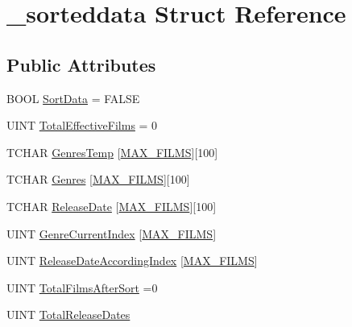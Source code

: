 \hypertarget{struct__sorteddata}{}\section{\+\_\+sorteddata Struct Reference}
\label{struct__sorteddata}
\subsection*{Public Attributes}
\begin{DoxyCompactItemize}
\item 
B\+O\+O\+L \hyperlink{struct__sorteddata_a3c45077dc4150390e3402acf51e8ee58}{Sort\+Data} = F\+A\+L\+S\+E
\item 
U\+I\+N\+T \hyperlink{struct__sorteddata_aa4043574ded74858a03e1ba566ee3fbc}{Total\+Effective\+Films} = 0
\item 
T\+C\+H\+A\+R \hyperlink{struct__sorteddata_a7d7b308abf87e4def51864eafeb8187d}{Genres\+Temp} \mbox{[}\hyperlink{_b_o_w-a_01film_01guessing_01game_8cpp_aa31048f49d109f6551271267f3470d11}{M\+A\+X\+\_\+\+F\+I\+L\+M\+S}\mbox{]}\mbox{[}100\mbox{]}
\item 
T\+C\+H\+A\+R \hyperlink{struct__sorteddata_abc4b7fe250ca171576e556746b6746f1}{Genres} \mbox{[}\hyperlink{_b_o_w-a_01film_01guessing_01game_8cpp_aa31048f49d109f6551271267f3470d11}{M\+A\+X\+\_\+\+F\+I\+L\+M\+S}\mbox{]}\mbox{[}100\mbox{]}
\item 
T\+C\+H\+A\+R \hyperlink{struct__sorteddata_ab85283a73e4e2969636d21578ee513b8}{Release\+Date} \mbox{[}\hyperlink{_b_o_w-a_01film_01guessing_01game_8cpp_aa31048f49d109f6551271267f3470d11}{M\+A\+X\+\_\+\+F\+I\+L\+M\+S}\mbox{]}\mbox{[}100\mbox{]}
\item 
U\+I\+N\+T \hyperlink{struct__sorteddata_ae1caef01262daf05883c3dc41e4bac7c}{Genre\+Current\+Index} \mbox{[}\hyperlink{_b_o_w-a_01film_01guessing_01game_8cpp_aa31048f49d109f6551271267f3470d11}{M\+A\+X\+\_\+\+F\+I\+L\+M\+S}\mbox{]}
\item 
U\+I\+N\+T \hyperlink{struct__sorteddata_a99040a368be9251b62ee5cdef76dbc05}{Release\+Date\+According\+Index} \mbox{[}\hyperlink{_b_o_w-a_01film_01guessing_01game_8cpp_aa31048f49d109f6551271267f3470d11}{M\+A\+X\+\_\+\+F\+I\+L\+M\+S}\mbox{]}
\item 
U\+I\+N\+T \hyperlink{struct__sorteddata_a10b08ddd063b34d1c330da1ec3587d3f}{Total\+Films\+After\+Sort} =0
\item 
U\+I\+N\+T \hyperlink{struct__sorteddata_a4d14c3c8abf8b96979e12566359040da}{Total\+Release\+Dates}
\item 

\end{DoxyCompactItemize}
